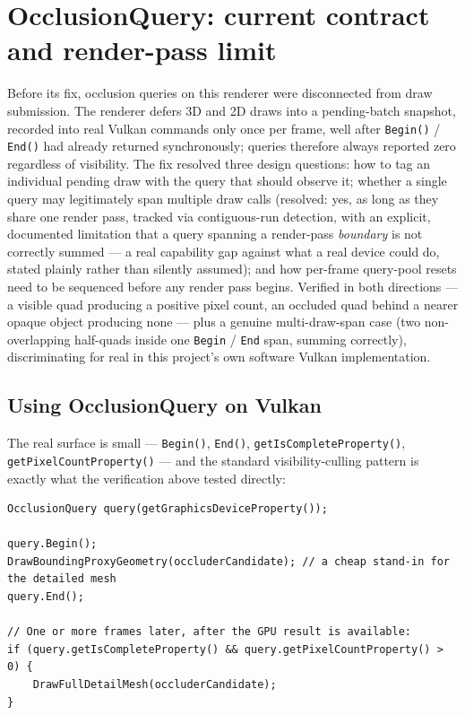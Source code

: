 \section{OcclusionQuery: current contract and render-pass limit}

Before its fix, occlusion queries on this renderer were disconnected from draw submission. The
renderer defers 3D and 2D draws into a pending-batch
snapshot, recorded into real Vulkan commands only once per frame, well after
\texttt{Begin()} / \texttt{End()} had already returned synchronously; queries therefore always
reported zero regardless of visibility. The fix resolved three design questions: how to tag an individual pending draw with the query
that should observe it; whether a single query may legitimately span multiple draw calls
(resolved: yes, as long as they share one render pass, tracked via contiguous-run detection,
with an explicit, documented limitation that a query spanning a render-pass \emph{boundary}
is not correctly summed --- a real capability gap against what a real device could do, stated
plainly rather than silently assumed); and how per-frame query-pool resets need to be
sequenced before any render pass begins. Verified in both directions --- a visible quad
producing a positive pixel count, an occluded quad behind a nearer opaque object producing
none --- plus a genuine multi-draw-span case (two non-overlapping half-quads inside one
\texttt{Begin} / \texttt{End} span, summing correctly), discriminating for real in this
project's own software Vulkan implementation.

\subsection{Using OcclusionQuery on Vulkan}

The real  surface is small --- \texttt{Begin()}, \texttt{End()},
\texttt{getIsCompleteProperty()}, \texttt{getPixelCountProperty()} --- and the standard
visibility-culling pattern is exactly what the verification above tested directly:

\begin{lstlisting}
OcclusionQuery query(getGraphicsDeviceProperty());

query.Begin();
DrawBoundingProxyGeometry(occluderCandidate); // a cheap stand-in for the detailed mesh
query.End();

// One or more frames later, after the GPU result is available:
if (query.getIsCompleteProperty() && query.getPixelCountProperty() > 0) {
    DrawFullDetailMesh(occluderCandidate);
}
\end{lstlisting}

